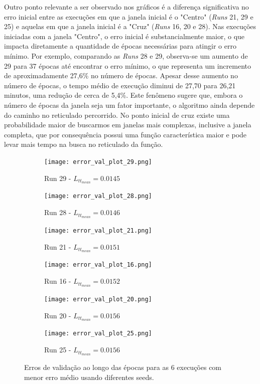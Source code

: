 Outro ponto relevante a ser observado nos gráficos é a diferença significativa no erro inicial entre as execuções em que a janela inicial é o "Centro" (\textit{Runs} 21, 29 e 25) e aquelas em que a janela inicial é a "Cruz" (\textit{Runs} 16, 20 e 28). Nas execuções iniciadas com a janela "Centro", o erro inicial é substancialmente maior, o que impacta diretamente a quantidade de épocas necessárias para atingir o erro mínimo. Por exemplo, comparando as \textit{Runs} 28 e 29, observa-se um aumento de 29 para 37 épocas até encontrar o erro mínimo, o que representa um incremento de aproximadamente 27,6\% no número de épocas. Apesar desse aumento no número de épocas, o tempo médio de execução diminui de 27,70 para 26,21 minutos, uma redução de cerca de 5,4\%. Este fenômeno sugere que, embora o número de épocas da janela seja um fator importante, o algoritmo ainda depende do caminho no reticulado percorrido. No ponto inicial de cruz existe uma probabilidade maior de buscarmos em janelas mais complexas, inclusive a janela completa, que por consequência possui uma função característica maior e pode levar mais tempo na busca no reticulado da função.

\begin{figure}[H]
  \centering
  
  \begin{subfigure}{0.45\textwidth}
    \centering
    \texttt{[image: error\_val\_plot\_29.png]}
    \caption{Run 29 - $L_{tt_{mean}}=0.0145$}
  \end{subfigure}
  \hfill
  \begin{subfigure}{0.45\textwidth}
    \centering
    \texttt{[image: error\_val\_plot\_28.png]}
    \caption{Run 28 - $L_{tt_{mean}}=0.0146$}
  \end{subfigure}
  
  \vspace{0.3cm}
  
  \begin{subfigure}{0.45\textwidth}
    \centering
    \texttt{[image: error\_val\_plot\_21.png]}
    \caption{Run 21 - $L_{tt_{mean}}=0.0151$}
  \end{subfigure}
  \hfill
  \begin{subfigure}{0.45\textwidth}
    \centering
    \texttt{[image: error\_val\_plot\_16.png]}
    \caption{Run 16 - $L_{tt_{mean}}=0.0152$}
  \end{subfigure}
  
  \vspace{0.3cm}
  
  \begin{subfigure}{0.45\textwidth}
    \centering
    \texttt{[image: error\_val\_plot\_20.png]}
    \caption{Run 20 - $L_{tt_{mean}}=0.0156$}
  \end{subfigure}
  \hfill
  \begin{subfigure}{0.45\textwidth}
    \centering
    \texttt{[image: error\_val\_plot\_25.png]}
    \caption{Run 25 - $L_{tt_{mean}}=0.0156$}
  \end{subfigure}

  \caption{Erros de validação ao longo das épocas para as 6 execuções com menor erro médio usando diferentes seeds.\label{fig:validation_errors}}
\end{figure}


